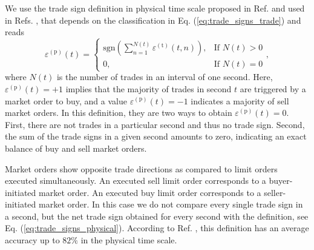 We use the trade sign definition in physical time scale proposed in Ref.
\cite{Wang_2016_cross} and used in Refs.
\cite{Wang_2017,Wang_2016_avg}, that depends on the classification in
Eq. (\ref{eq:trade_signs_trade}) and reads
\begin{equation}\label{eq:trade_signs_physical}
    \varepsilon^{\left(\textrm{p}\right)}\left(t\right)=\left\{
    \begin{array}{cc}
    \text{sgn}\left(\sum_{n=1}^{N\left(t\right)}
    \varepsilon^{\left(\textrm{t}\right)} \left(t,n\right)\right),
    & \text{If }N \left(t\right)>0\\
    0, & \text{If }N\left(t\right)=0
    \end{array}\right. ,
\end{equation}
where $N \left(t \right)$ is the number of trades in an interval of one second.
Here, $\varepsilon^{\left(\textrm{p}\right)}\left( t \right) = +1$ implies that
the majority of trades in second $t$ are triggered by a market order to buy,
and a value $\varepsilon^{\left(\textrm{p}\right)}\left( t \right) = -1$
indicates a majority of sell market orders. In this definition, they are two
ways to obtain $\varepsilon^{\left(\textrm{p}\right)}\left( t \right) = 0$.
First, there are not trades in a particular second and thus no trade sign.
Second, the sum of the trade signs in a given second amounts to zero,
indicating an exact balance of buy and sell market orders.

Market orders show opposite trade directions as compared to limit orders
executed simultaneously. An executed sell limit order corresponds to a
buyer-initiated market order. An executed buy limit order corresponds to a
seller-initiated market order. In this case we do not compare every single
trade sign in a second, but the net trade sign obtained for every second with
the definition, see Eq. (\ref{eq:trade_signs_physical}). According to Ref.
\cite{Wang_2016_cross}, this definition has an average accuracy up to $82\%$ in
the physical time scale.
